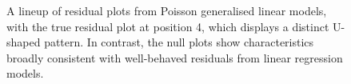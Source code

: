\documentclass[
doublespace,
  times]{anzsauth}
\newenvironment{Shaded}{\begin{snugshade}}{\end{snugshade}}
\newcommand{\AttributeTok}[1]{\textcolor[rgb]{0.40,0.45,0.13}{#1}}
\newcommand{\DecValTok}[1]{\textcolor[rgb]{0.68,0.00,0.00}{#1}}
\newcommand{\FloatTok}[1]{\textcolor[rgb]{0.68,0.00,0.00}{#1}}
\newcommand{\FunctionTok}[1]{\textcolor[rgb]{0.28,0.35,0.67}{#1}}
\newcommand{\NormalTok}[1]{\textcolor[rgb]{0.00,0.23,0.31}{#1}}
\newcommand{\OtherTok}[1]{\textcolor[rgb]{0.00,0.23,0.31}{#1}}
\newcommand{\SpecialCharTok}[1]{\textcolor[rgb]{0.37,0.37,0.37}{#1}}
\newcommand{\StringTok}[1]{\textcolor[rgb]{0.13,0.47,0.30}{#1}}
\begin{document}
\begin{Shaded}
\end{Shaded}

\begin{figure}[H]


\caption{\label{fig-pois-lineup}A lineup of residual plots from Poisson
generalised linear models, with the true residual plot at position 4,
which displays a distinct U-shaped pattern. In contrast, the null plots
show characteristics broadly consistent with well-behaved residuals from
linear regression models.}

\end{figure}%
\end{document}
